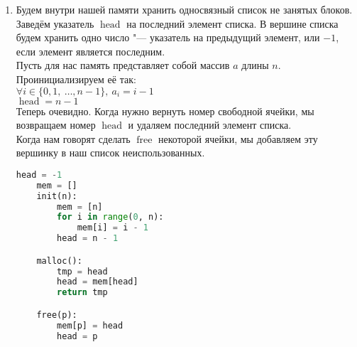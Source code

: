 \documentclass[a4paper, 10pt]{article}
\begin{document}
\begin{enumerate}
\item
\begin{enumerate}
	Будем внутри нашей памяти хранить односвязный список не занятых блоков. Заведём указатель $\operatorname{head}$ на последний элемент списка. В вершине списка будем хранить одно число "--- указатель на предыдущий элемент, или $-1$, если элемент является последним.\\
	Пусть для нас память представляет собой массив $a$ длины $n$.
	Проинициализируем её так:\\$\forall i \in \{0, 1, \medspace \ldots, n - 1\}, \medspace a_i = i - 1$\\
	$\operatorname{head} = n - 1$\\
	Теперь очевидно. Когда нужно вернуть номер свободной ячейки, мы возвращаем номер $\operatorname{head}$ и удаляем последний элемент списка.\\
	Когда нам говорят сделать $\operatorname{free}$ некоторой ячейки, мы добавляем эту вершинку в наш список неиспользованных.\\
	\begin{lstlisting}[language=Python]
	head = -1
	mem = []
	init(n):
		mem = [n]
		for i in range(0, n):
			mem[i] = i - 1
		head = n - 1

	malloc():
		tmp = head
		head = mem[head]
		return tmp

	free(p):
		mem[p] = head
		head = p\end{lstlisting}
\end{enumerate}


\end{enumerate}
\end{document}
